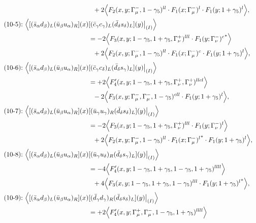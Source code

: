 \begin{align}
\notag\\*&\ \ 
 + 2\Big\langle F_2(x,y;\Gamma_\mu^-,1-\gamma_5)^{ll} \cdot F_1(x;\Gamma_\mu^-)^l \cdot F_1(y;1+\gamma_5)^l\Big\rangle,
\\
\mbox{(10-5):}\ 
\Big\langle
[(\bar s_\alpha d_\beta)_L(\bar u_\beta u_\alpha)_R](x)&
[(\bar c_\gamma c_\gamma)_L(\bar d_\delta s_\delta)_L](y)\big|_{(I)}
\Big\rangle
\notag\\*
&=
-2\Big\langle F_3(x,y;1-\gamma_5,1+\gamma_5,\Gamma_\nu^+)^{lll} \cdot {F_1(y;\Gamma_\nu^-)^c}^*\Big\rangle
\notag\\*&\ \ 
 + 2\Big\langle F_2(x,y;\Gamma_\mu^-,1-\gamma_5)^{ll} \cdot F_1(x;\Gamma_\mu^-)^c \cdot F_1(y;1+\gamma_5)^l\Big\rangle,
\\
\mbox{(10-6):}\ 
\Big\langle
[(\bar s_\alpha d_\beta)_L(\bar u_\beta u_\alpha)_R](x)&
[(\bar c_\gamma c_\delta)_L(\bar d_\delta s_\gamma)_L](y)\big|_{(I)}
\Big\rangle
\notag\\*
&=
 + 2\Big\langle F_4'(x,y;1-\gamma_5,1+\gamma_5,\Gamma_\nu^+,\Gamma_\nu^+)^{llcl}\Big\rangle
\notag\\*&\ \ 
-2\Big\langle F_3(x,y;\Gamma_\mu^-,\Gamma_\mu^-,1-\gamma_5)^{cll} \cdot F_1(y;1+\gamma_5)^l\Big\rangle,
\\
\mbox{(10-7):}\ 
\Big\langle
[(\bar s_\alpha d_\beta)_L(\bar u_\beta u_\alpha)_R](x)&
[(\bar u_\gamma u_\gamma)_R(\bar d_\delta s_\delta)_L](y)\big|_{(I)}
\Big\rangle
\notag\\*
&=
-2\Big\langle F_3(x,y;1-\gamma_5,1+\gamma_5,\Gamma_\nu^+)^{lll} \cdot F_1(y;\Gamma_\nu^-)^l\Big\rangle
\notag\\*&\ \ 
 + 2\Big\langle F_2(x,y;\Gamma_\mu^-,1-\gamma_5)^{ll} \cdot {F_1(x;\Gamma_\mu^-)^l}^* \cdot F_1(y;1+\gamma_5)^l\Big\rangle,
\\
\mbox{(10-8):}\ 
\Big\langle
[(\bar s_\alpha d_\beta)_L(\bar u_\beta u_\alpha)_R](x)&
[(\bar u_\gamma u_\delta)_R(\bar d_\delta s_\gamma)_L](y)\big|_{(I)}
\Big\rangle
\notag\\*
&=
-4\Big\langle F_4'(x,y;1-\gamma_5,1+\gamma_5,1-\gamma_5,1+\gamma_5)^{llll}\Big\rangle
\notag\\*&\ \ 
 + 4\Big\langle F_3(x,y;1-\gamma_5,1+\gamma_5,1-\gamma_5)^{lll} \cdot {F_1(y;1+\gamma_5)^l}^*\Big\rangle,
\\
\mbox{(10-9):}\ 
\Big\langle
[(\bar s_\alpha d_\beta)_L(\bar u_\beta u_\alpha)_R](x)&
[(\bar d_\gamma d_\gamma)_R(\bar d_\delta s_\delta)_L](y)\big|_{(I)}
\Big\rangle
\notag\\*
&=
 + 2\Big\langle F_4'(x,y;\Gamma_\mu^+,\Gamma_\mu^-,1-\gamma_5,1+\gamma_5)^{llll}\Big\rangle

\end{align}
